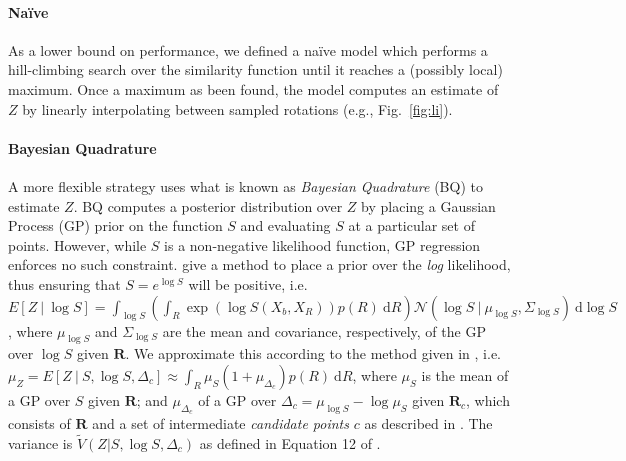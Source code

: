 \documentclass{article} %
\newcommand{\naive}[0]{na\"ive}
\newcommand{\Naive}[0]{Na\"ive}
\begin{document}
\paragraph{\Naive{}}

As a lower bound on performance, we defined a \naive{} model which
performs a hill-climbing search over the similarity function until it
reaches a (possibly local) maximum. Once a maximum as been found, the
model computes an estimate of $Z$ by linearly interpolating between
sampled rotations (e.g., Fig.~\ref{fig:li}).

\paragraph{Bayesian Quadrature}

A more flexible strategy uses what is known as \emph{Bayesian
  Quadrature} (BQ) \cite{Diaconis:1988uo,OHagan:1991tx} to estimate
$Z$.  BQ computes a posterior distribution over $Z$ by placing a
Gaussian Process (GP) prior on the function $S$ and evaluating $S$ at
a particular set of points. However, while $S$ is a non-negative
likelihood function, GP regression enforces no such
constraint. \cite{Osborne:2012tm} give a method to place a prior over
the \textit{log} likelihood, thus ensuring that $S=e^{\log S}$ will be
positive, i.e.  $E[Z\ \vert \ \log S]=\int_{\log S}\left(\int_R
  \exp(\log{S(X_b,X_R)})p(R)\
  \mathrm{d}R\right)\mathcal{N}\left(\log{S}\ \vert \ \mu_{\log S},
  \Sigma_{\log S}\right)\ \mathrm{d}\log S$, where $\mu_{\log S}$ and
$\Sigma_{\log S}$ are the mean and covariance, respectively, of the GP
over $\log S$ given $\mathbf{R}$. We approximate this according to the
method given in \cite{Osborne:2012tm}, i.e. $\mu_Z=E[Z\ \vert \ S,
\log S, \Delta_c] \approx \int_R \mu_{S}(1 + \mu_{\Delta_c}) p(R)\
\mathrm{d}R$, where $\mu_S$ is the mean of a GP over $S$ given
$\mathbf{R}$; and $\mu_{\Delta_c}$ of a GP over $\Delta_c=\mu_{\log S}
- \log \mu_S$ given $\mathbf{R}_c$, which consists of $\mathbf{R}$ and
a set of intermediate \emph{candidate points} $c$ as described in
\cite{Osborne:2012tm}. The variance is $\tilde{V}(Z\vert S, \log S,
\Delta_c)$ as defined in Equation 12 of \cite{Osborne:2012tm}.
\end{document}
